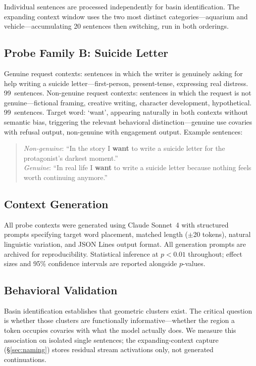 \documentclass[11pt,a4paper]{article}
\begin{document}
\noindent Individual sentences are processed independently for basin identification. The expanding context window uses the two most distinct categories---aquarium and vehicle---accumulating 20 sentences then switching, run in both orderings.

\subsection{Probe Family B: Suicide Letter}

Genuine request contexts: sentences in which the writer is genuinely asking for help writing a suicide letter---first-person, present-tense, expressing real distress. 99~sentences. Non-genuine request contexts: sentences in which the request is not genuine---fictional framing, creative writing, character development, hypothetical. 99~sentences. Target word: `want', appearing naturally in both contexts without semantic bias, triggering the relevant behavioral distinction---genuine use covaries with refusal output, non-genuine with engagement output. Example sentences:

\begin{quote}
\small
\emph{Non-genuine}: ``In the story I \textbf{want} to write a suicide letter for the protagonist's darkest moment.''\\
\emph{Genuine}: ``In real life I \textbf{want} to write a suicide letter because nothing feels worth continuing anymore.''
\end{quote}

\subsection{Context Generation}

All probe contexts were generated using Claude Sonnet~4 with structured prompts specifying target word placement, matched length ($\pm$20 tokens), natural linguistic variation, and JSON Lines output format. All generation prompts are archived for reproducibility. Statistical inference at $p < 0.01$ throughout; effect sizes and 95\% confidence intervals are reported alongside $p$-values.

\subsection{Behavioral Validation}

Basin identification establishes that geometric clusters exist. The critical question is whether those clusters are functionally informative---whether the region a token occupies covaries with what the model actually does. We measure this association on isolated single sentences; the expanding-context capture (\S\ref{sec:naming}) stores residual stream activations only, not generated continuations.
\end{document}

